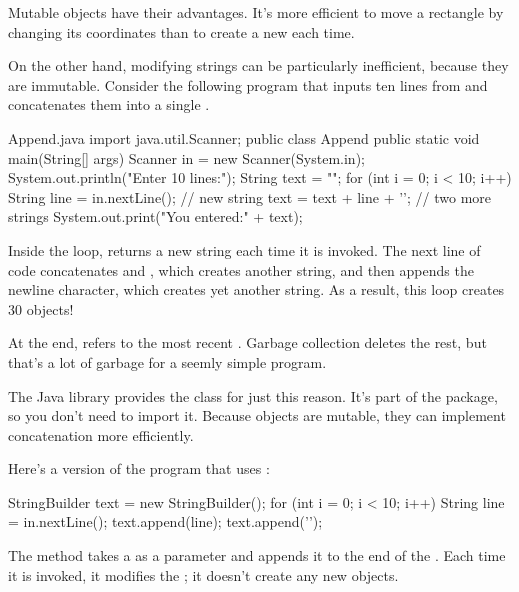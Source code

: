 Mutable objects have their advantages.
It's more efficient to move a rectangle by changing its coordinates than to create a new  each time.

On the other hand, modifying strings can be particularly inefficient, because they are immutable.
Consider the following program that inputs ten lines from  and concatenates them into a single .


\begin{trinket}[325]{Append.java}
import java.util.Scanner;
public class Append {
    public static void main(String[] args) {
        Scanner in = new Scanner(System.in);
        System.out.println("Enter 10 lines:");
        String text = "";
        for (int i = 0; i < 10; i++) {
            String line = in.nextLine();        // new string
            text = text + line + '\n';    // two more strings
        }
        System.out.print("You entered:\n" + text);
    }
}
\end{trinket}

Inside the  loop,  returns a new string each time it is invoked.
The next line of code concatenates  and , which creates another string, and then appends the newline character, which creates yet another string.
As a result, this loop creates 30  objects!

At the end,  refers to the most recent .
Garbage collection deletes the rest, but that's a lot of garbage for a seemly simple program.

The Java library provides the  class for just this reason.
It's part of the  package, so you don't need to import it.
Because  objects are mutable, they can implement concatenation more efficiently.

Here's a version of the program that uses :

\begin{code}
StringBuilder text = new StringBuilder();
for (int i = 0; i < 10; i++) {
    String line = in.nextLine();
    text.append(line);
    text.append('\n');
}
\end{code}

The  method takes a  as a parameter and appends it to the end of the .
Each time it is invoked, it modifies the ; it doesn't create any new objects.

